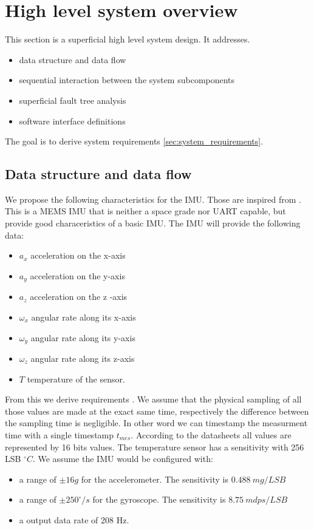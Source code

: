 \section{High level system overview}
This section is a superficial high level system design. It addresses.
\begin{itemize}
    \item data structure and data flow
    \item sequential interaction between the system subcomponents
    \item superficial fault tree analysis
    \item software interface definitions
\end{itemize}
The goal is to derive system requirements \ref{sec:system_requirements}.

\subsection{Data structure and data flow}
We propose the following characteristics for the IMU. Those are inspired from \cite{lm6ds3}.
This is a MEMS IMU that is neither a space grade nor UART capable, but provide good characeristics of a basic IMU.
The IMU will provide the following data:
\begin{itemize}
    \item $a_x$ acceleration on the x-axis
    \item $a_y$ acceleration on the y-axis
    \item $a_z$ acceleration on the z -axis
    \item $\omega_x$ angular rate along its x-axis
    \item $\omega_y$ angular rate along its y-axis
    \item $\omega_z$ angular rate along its z-axis
    \item $T$ temperature of the sensor.
\end{itemize}
From this we derive requirements .
We assume that the physical sampling of all those values are made at the exact same time, respectively the difference between the sampling time is negligible.
In other word we can timestamp the measurment time with a single timestamp $t_{mes}$.
According to the datasheets all values are represented by 16 bits values.
The temperature sensor has a sensitivity with 256 LSB $^{\circ}C$.
We assume the IMU would be configured with:
\begin{itemize}
    \item a range of $\pm 16g$ for the accelerometer. The sensitivity is $0.488~mg/LSB$
    \item a range of $\pm 250^{\circ}/s$ for the gyroscope. The sensitivity is $8.75~mdps/LSB$
    \item a output data rate of 208 Hz.
\end{itemize}


